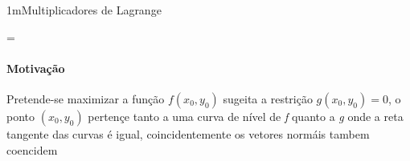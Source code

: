 \documentclass["./AM_2C-Testes_Anotacoes.tex"]{subfiles}
\begin{document}
\begin{sectionBox}1m{Multiplicadores de Lagrange} %

  \begin{BM}
    = \lambda\,
  \end{BM}

  \paragraph*{Motivação} Pretende-se maximizar a função \(f(x_0,y_0)\) sugeita a restrição \(g(x_0,y_0)=0\), o ponto \((x_0,y_0)\) pertençe tanto a uma curva de nível de \textit{f} quanto a \textit{g} onde a reta tangente das curvas é igual, coincidentemente os vetores normáis tambem coencidem 

\end{sectionBox}
\end{document}
